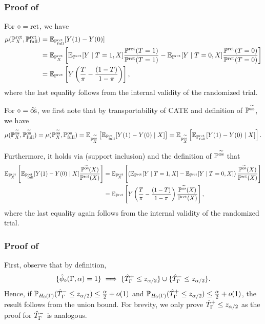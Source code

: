 \subsubsection{Proof of~}
\label{apx:proof_id_ate}
For $\diamond=\rct$, we have
\begin{align*}
	\mu(\pxrct, \pfullrct) &= \EE_{\pfullrct} [ Y(1)-Y(0)] \\
	&= \EE_{\pxrct} \left[ \EE_{\prct}[Y \mid T=1,X]\frac{\prct(T=1)}{\prct(T=1)}  -\EE_{\prct}[Y \mid T=0,X]\frac{\prct(T=0)}{\prct(T=0)}  \right]\\
	&= \EE_{\prct} \left[ Y\left(\frac{T}{\pi} - \frac{(1-T)}{1-\pi}  \right)  \right],
\end{align*}
where the last equality follows from the internal validity of the randomized trial.

For $\diamond=\obsres$, we first note that by transportability of CATE and definition of $\pobsres$, we have
\begin{equation*}
\mu(\pobsres_X, \pfullobsres) = \mu(\pobsres_X, \pfullobs) 
= \EE_{\pobsres_X}\left[ \EE_{\pfullobs}[Y(1) - Y(0) \mid X] \right]  = \EE_{\pobsres_X}\left[ \EE_{\pfullrct}[Y(1) - Y(0) \mid X] \right]. 
\end{equation*}

Furthermore, it holds via  (support inclusion) and the definition of $\pobsres$ that
\begin{align*}
\EE_{\prct_X}\left[ \EE_{\pfullrct}[Y(1) - Y(0) \mid X] \frac{\pobsres(X)}{\prct(X)} \right] 
&=\EE_{\pxrct}\left[ \left( \EE_{\prct}[Y \mid T=1, X] - \EE_{\prct}[Y \mid T=0, X]  \right) \frac{\pobsres(X)}{\prct(X)} \right] \\
&= \EE_{\prct}\left[ Y\left( \frac{T}{\pi} - \frac{(1-T)}{1-\pi} \right) \frac{\pobsres(X)}{\prct(X)} \right], 
\end{align*}
where the last equality again
follows from the internal validity of the randomized trial.

\subsubsection{Proof of~}
\label{apx:proof_test}
First, observe that by definition,
\begin{equation}
\{\test_\diamond(\confvalue,\alpha) = 1\} \implies
\{\hat{T}_\confvalue^+  \leq z_{\alpha/2} \} \cup \{  \hat{T}_\confvalue^-  \leq z_{\alpha/2} \}. 
\end{equation} 
Hence, if $\p_{\hnull(\Gamma)}(\hat{T}_\confvalue^-  \leq z_{\alpha/2}) \leq \frac{\alpha}{2} + o(1)$ and $\p_{\hnull(\Gamma)}(\hat{T}_\confvalue^+  \leq z_{\alpha/2}) \leq \frac{\alpha}{2} + o(1)$, the result follows from the union bound.
For brevity, we only prove $\hat{T}_\confvalue^+ \leq z_{\alpha/2}$ as the proof for $\hat{T}_\confvalue^-$ is analogous. 



